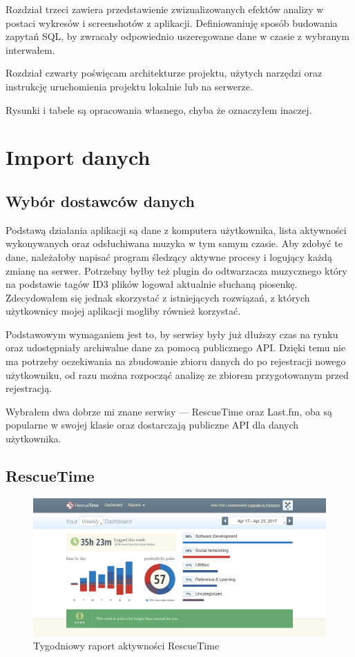 \documentclass[openright]{xmgr}
\begin{document}
    Rozdział trzeci zawiera przedstawienie zwizualizowanych efektów analizy w postaci wykresów i screenshotów z aplikacji.
    Definiowaniuję sposób budowania zapytań SQL, by zwracały odpowiednio uszeregowane dane w czasie z wybranym interwałem.

    Rozdział czwarty poświęcam architekturze projektu, użytych narzędzi oraz instrukcję uruchomienia projektu lokalnie lub na serwerze.

    Rysunki i tabele są opracowania własnego, chyba że oznaczyłem inaczej.

\chapter{Import danych}

    \section{Wybór dostawców danych}

    Podstawą działania aplikacji są dane z komputera użytkownika,
    lista aktywności wykonywanych oraz odsłuchiwana muzyka w tym samym czasie.
    Aby zdobyć te dane, należałoby napisać program śledzący aktywne procesy i logujący każdą zmianę na serwer.
    Potrzebny byłby też plugin do odtwarzacza muzycznego który na podstawie tagów ID3 plików logował aktualnie słuchaną piosenkę.
    Zdecydowałem się jednak skorzystać z istniejących rozwiązań, z których użytkownicy mojej aplikacji mogliby również korzystać.

    Podstawowym wymaganiem jest to, by serwisy były już dłuższy czas na rynku oraz udostępniały archiwalne dane za pomocą publicznego API.
    Dzięki temu nie ma potrzeby oczekiwania na zbudowanie zbioru danych do po rejestracji nowego użytkowniku,
    od razu można rozpocząć analizę ze zbiorem przygotowanym przed rejestracją.

    Wybrałem dwa dobrze mi znane serwisy --- RescueTime oraz Last.fm,
    oba są popularne w swojej klasie oraz dostarczają publiczne API dla danych użytkownika.

        \section*{RescueTime}

        \begin{figure}
          \includegraphics[width=\linewidth]{fig/rescuetime-dashboard.png}
          \caption{Tygodniowy raport aktywności RescueTime}
          \label{fig:rescuetime-dashboard}
        \end{figure}
\end{document}

